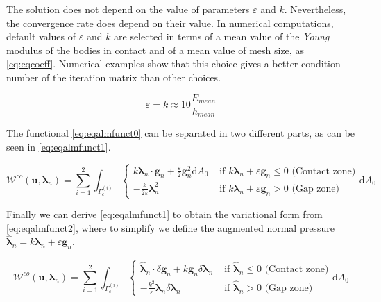 \documentclass[a4paper,10pt]{article} %
\begin{document}
The solution does not depend on the value of parameters $\varepsilon$ and $k$. Nevertheless, the convergence rate does depend on their value. In numerical computations, default values of $\varepsilon$ and $k$ are selected in terms of a mean value of the \textit{Young} modulus of the bodies in contact and of a mean value of mesh size, as \eqref{eq:eqcoeff}. Numerical examples show that this choice gives a better condition number of the iteration matrix than other choices. 

\begin{equation}\label{eq:eqcoeff}
 \varepsilon = k \approx 10 \frac{E_{mean}}{h_{mean}}
\end{equation}

The functional \eqref{eq:eqalmfunct0} can be separated in two different parts, as can be seen in \eqref{eq:eqalmfunct1}.

\begin{equation}\label{eq:eqalmfunct1}
  \mathcal{W}^{co}(\mathbf{u},\boldsymbol{\lambda}_n) = \sum_{i = 1}^2 \int_{\Gamma_c^{(i)}} \begin{cases}  k \boldsymbol{\lambda}_n \cdot \mathbf{g}_n  + \frac{\varepsilon}{2} \mathbf{g}_n^2 \text{d}A_0 & \text{ if } k\boldsymbol{\lambda}_n +\varepsilon \mathbf{g}_n \leq 0 \text{ (Contact zone)} \\ - \frac{k}{2\varepsilon} \boldsymbol{\lambda}_n^2   & \text{ if } k\boldsymbol{\lambda}_n +\varepsilon \mathbf{g}_n > 0 \text{ (Gap zone)} \end{cases}\text{d}A_0 
\end{equation}

Finally we can derive \eqref{eq:eqalmfunct1} to obtain the variational form from \eqref{eq:eqalmfunct2}, where to simplify we define the augmented normal pressure $\hat{\boldsymbol{\lambda}}_{n} = k\boldsymbol{\lambda}_n +\varepsilon \mathbf{g}_n $.

\begin{equation}\label{eq:eqalmfunct2}
  \mathcal{W}^{co}(\mathbf{u},\boldsymbol{\lambda}_n) = \sum_{i = 1}^2 \int_{\Gamma_c^{(i)}}\begin{cases}  \hat{\boldsymbol{\lambda}}_{n} \cdot \delta\mathbf{g}_n + k \mathbf{g}_n \delta\boldsymbol{\lambda}_n & \text{ if } \hat{\boldsymbol{\lambda}}_{n} \leq 0 \text{ (Contact zone)} \\  - \frac{k^2}{\varepsilon} \boldsymbol{\lambda}_n \delta\boldsymbol{\lambda}_n & \text{ if } \hat{\boldsymbol{\lambda}}_{n} > 0 \text{ (Gap zone)} \end{cases} \text{d}A_0 
\end{equation}
\end{document}

